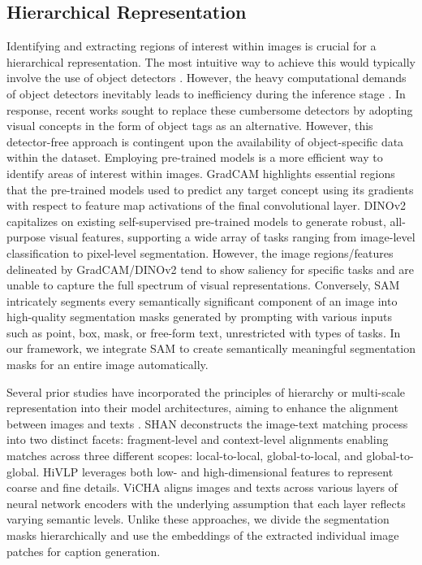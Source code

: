 \subsection{Hierarchical Representation}\label{rw:hier}
Identifying and extracting regions of interest within images is crucial for a hierarchical representation. The most intuitive way to achieve this would typically 
involve the use of object detectors \cite{yao2019hierarchy,cornia2020meshed,zhang2021rstnet}. However, the heavy computational demands of object detectors inevitably leads to inefficiency during the inference stage \cite{yao2019hierarchy,cornia2020meshed,zhang2021rstnet}. In response, recent works sought to replace these cumbersome detectors by adopting visual concepts in the form of object tags \cite{fang2022injecting,shukor2022efficient} as an alternative. However, this detector-free approach is contingent upon the availability of object-specific data within the dataset. Employing pre-trained models is a more efficient way to identify areas of interest within images. GradCAM \cite{selvaraju2017grad} highlights essential regions that the pre-trained models used to predict any target concept using its gradients with respect to feature map activations of the final convolutional layer. DINOv2 \cite{oquab2023dinov2} capitalizes on existing self-supervised pre-trained models to generate robust, all-purpose visual features, supporting a wide array of tasks ranging from image-level classification to pixel-level segmentation. However, the image regions/features delineated by GradCAM/DINOv2 tend to show saliency for specific tasks and are unable to capture the full spectrum of visual representations. Conversely, SAM \cite{kirillov2023segany} intricately segments every semantically significant component of an image into high-quality segmentation masks generated by prompting with various inputs such as point, box, mask, or free-form text, unrestricted with types of tasks. In our framework, we integrate SAM \cite{kirillov2023segany} to create semantically meaningful segmentation masks for an entire image automatically.


Several prior studies have incorporated the principles of hierarchy or multi-scale representation into their model architectures, aiming to enhance the alignment between images and texts \cite{ji2021step,Shao2023ICCV,shukor2022efficient}. SHAN \cite{ji2021step} deconstructs the image-text matching process into two distinct facets: fragment-level and context-level alignments enabling matches across three different scopes: local-to-local, global-to-local, and global-to-global. HiVLP \cite{Shao2023ICCV} leverages both low- and high-dimensional features to represent coarse and fine details. ViCHA \cite{shukor2022efficient} aligns images and texts across various layers of neural network encoders with the underlying assumption that each layer reflects varying semantic levels. Unlike these approaches, we divide the segmentation masks hierarchically and use the embeddings of the extracted individual image patches for caption generation.

